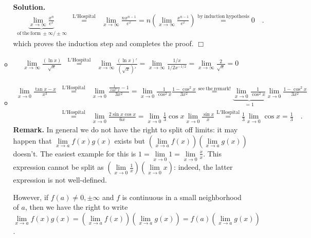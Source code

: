 \documentclass[12pt]{book}
\newenvironment{solution}{\textbf{Solution.} }{$\Box$}
\begin{document}
\begin{itemize}
\begin{itemize}
\begin{solution}
\[\begin{array}{rcl}
\underbrace{\lim\limits_{x\to \infty} \frac{x^n}{e^x}}_{\mathrm{~of~the~form~}\pm \infty/\pm\infty} &\stackrel{\mathrm{L'Hospital}}{=} & \lim\limits_{x\to \infty} \frac{nx^{n-1}}{e^x}=n\left( \lim\limits_{x\to \infty} \frac{x^{n-1}}{e^x}\right) \stackrel{\mathrm{by~induction~hypothesis}}{=}0\quad .
\end{array}
\]
which proves the induction step and completes the proof.
\end{solution}
\item 
\[
\begin{array}{rcl}
\lim\limits_{x\to \infty} \frac{(\ln x)}{\sqrt{x}} &\stackrel{\mathrm{L'Hospital}}{=} & \lim\limits_{x\to \infty} \frac{(\ln x)'}{(\sqrt{x})'}=
 \lim\limits_{x\to \infty} \frac{1/x}{1/2x^{-1/2}}= \lim\limits_{x\to \infty} \frac{2}{\sqrt{x}}=0
\end{array}
\]
\item 
\[
\begin{array}{rcl}
\lim\limits_{x\to 0}\limits \frac{\tan x- x}{x^3}&\stackrel{\mathrm{L'Hospital}}{=} &\lim\limits_{x\to 0} \frac{\frac{1}{\cos^2 x}-1}{3x^2}=
\lim\limits_{x\to 0} \frac{1}{\cos^2x}\frac{1-\cos^2x}{3x^2}\stackrel{\mathrm{see~the~remark!}}{=}\underbrace{\lim\limits_{x\to 0} \frac{1}{\cos^2x}}_{=1} \lim\limits_{x\to 0} \frac{1-\cos^2x}{3x^2} \\
&\stackrel{\mathrm{L'Hospital}}{=}&\lim\limits_{x\to 0}\frac{2\sin x\cos x }{6x}= \lim\limits_{x\to 0}\frac 13\cos x\lim\limits_{x\to 0}\frac{\sin x}{x}\stackrel{\mathrm{L'Hospital}}{=}\frac 13\lim\limits_{x\to 0}\cos x= \frac 13\quad . 
\end{array}
\]
\textbf{Remark.} In general we do not have the right to split off limits: it may happen that $\lim\limits_{x\to a} f(x)g(x)$ exists but $ \left(\lim\limits_{x\to a} f(x)\right) \left(\lim\limits_{x\to a} g(x)\right)$ doesn't. The easiest example for this is $1=\lim\limits_{x\to 0} 1 =  \lim\limits_{x\to 0} \frac{x}{x}$. This expression cannot be split as $\left(\lim\limits_{x\to 0} \frac{1}{x}\right)\left(\lim\limits_{x\to 0} x \right)$: indeed, the latter expression is not well-defined.

However, if $f(a)\neq 0, \pm \infty$ and $f$ is continuous in a small neighborhood of $a$, then we have the right to write $\lim\limits_{x\to a} f(x)g(x)= \left(\lim\limits_{x\to a} f(x)\right) \left(\lim\limits_{x\to a} g(x)\right)= f(a)\left(\lim\limits_{x\to a} g(x)\right)$.

\end{itemize}

\end{itemize}
\end{document}
